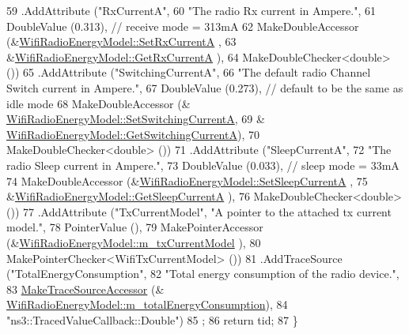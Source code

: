 \begin{DoxyCode}
59     .AddAttribute (\textcolor{stringliteral}{"RxCurrentA"},
60                    \textcolor{stringliteral}{"The radio Rx current in Ampere."},
61                    DoubleValue (0.313),    \textcolor{comment}{// receive mode = 313mA}
62                    MakeDoubleAccessor (&\hyperlink{classns3_1_1WifiRadioEnergyModel_a61ec24c769756468a21332659f805ddc}{WifiRadioEnergyModel::SetRxCurrentA}
      ,
63                                        &\hyperlink{classns3_1_1WifiRadioEnergyModel_a720fcc160a64f12da94efab74fcebf81}{WifiRadioEnergyModel::GetRxCurrentA}
      ),
64                    MakeDoubleChecker<double> ())
65     .AddAttribute (\textcolor{stringliteral}{"SwitchingCurrentA"},
66                    \textcolor{stringliteral}{"The default radio Channel Switch current in Ampere."},
67                    DoubleValue (0.273),  \textcolor{comment}{// default to be the same as idle mode}
68                    MakeDoubleAccessor (&
      \hyperlink{classns3_1_1WifiRadioEnergyModel_abf01728dcaaa4cf7c3adc76e0dfa7f62}{WifiRadioEnergyModel::SetSwitchingCurrentA},
69                                        &
      \hyperlink{classns3_1_1WifiRadioEnergyModel_a616decc2a1cc0d9f97564ac647282638}{WifiRadioEnergyModel::GetSwitchingCurrentA}),
70                    MakeDoubleChecker<double> ())
71     .AddAttribute (\textcolor{stringliteral}{"SleepCurrentA"},
72                    \textcolor{stringliteral}{"The radio Sleep current in Ampere."},
73                    DoubleValue (0.033),  \textcolor{comment}{// sleep mode = 33mA}
74                    MakeDoubleAccessor (&\hyperlink{classns3_1_1WifiRadioEnergyModel_ac8f0d94b09aaca5d263418f0d12999d2}{WifiRadioEnergyModel::SetSleepCurrentA}
      ,
75                                        &\hyperlink{classns3_1_1WifiRadioEnergyModel_a4b2c29b0645c30020d6fe88332a719c3}{WifiRadioEnergyModel::GetSleepCurrentA}
      ),
76                    MakeDoubleChecker<double> ())
77     .AddAttribute (\textcolor{stringliteral}{"TxCurrentModel"}, \textcolor{stringliteral}{"A pointer to the attached tx current model."},
78                    PointerValue (),
79                    MakePointerAccessor (&\hyperlink{classns3_1_1WifiRadioEnergyModel_addde3c71494589b051fc5e23ff8c6aa9}{WifiRadioEnergyModel::m\_txCurrentModel}
      ),
80                    MakePointerChecker<WifiTxCurrentModel> ())
81     .AddTraceSource (\textcolor{stringliteral}{"TotalEnergyConsumption"},
82                      \textcolor{stringliteral}{"Total energy consumption of the radio device."},
83                      \hyperlink{group__tracing_gab21a770b9855af4e8f69f7531ea4a6b0}{MakeTraceSourceAccessor} (&
      \hyperlink{classns3_1_1WifiRadioEnergyModel_a56ee62d581f8a6b3ebf466e97d028568}{WifiRadioEnergyModel::m\_totalEnergyConsumption}),
84                      \textcolor{stringliteral}{"ns3::TracedValueCallback::Double"})
85   ; 
86   \textcolor{keywordflow}{return} tid;
87 \}
\end{DoxyCode}


